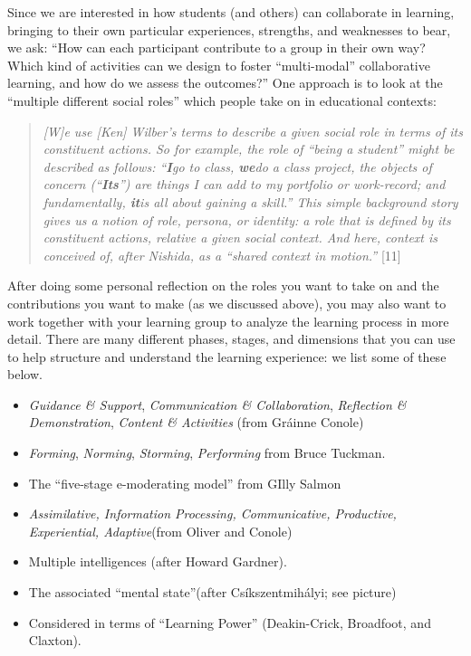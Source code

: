 Since we are interested in how students (and others) can collaborate in
learning, bringing to their own particular experiences, strengths, and
weaknesses to bear, we ask: ``How can each participant contribute to a
group in their own way? Which kind of activities can we design to foster
``multi-modal'' collaborative learning, and how do we assess the
outcomes?'' One approach is to look at the ``multiple different social
roles'' which people take on in educational contexts:

\begin{quote}
\emph{{[}W{]}e use {[}Ken{]} Wilber's terms to describe a given social
role in terms of its constituent actions. So for example, the role of
``being a student'' might be described as follows: ``\textbf{I}}\emph{go
to class, \textbf{we}}\emph{do a class project, the objects of concern
(``\textbf{Its}}\emph{'') are things I can add to my portfolio or
work-record; and fundamentally, \textbf{it}}\emph{is all about gaining a
skill.'' This simple background story gives us a notion of role,
persona, or identity: a role that is defined by its constituent actions,
relative a given social context. And here, context is conceived of,
after Nishida, as a ``shared context in motion.''} {[}11{]}
\end{quote}

After doing some personal reflection on the roles you want to take on
and the contributions you want to make (as we discussed above), you may
also want to work together with your learning group to analyze the
learning process in more detail. There are many different phases,
stages, and dimensions that you can use to help structure and understand
the learning experience: we list some of these below.

\begin{itemize}
\item
  \emph{Guidance \& Support}, \emph{Communication \& Collaboration},
  \emph{Reflection \& Demonstration}, \emph{Content \& Activities} (from
  Gráinne Conole)
\item
  \emph{Forming}, \emph{Norming}, \emph{Storming}, \emph{Performing}
  from Bruce Tuckman.
\item
  The ``five-stage e-moderating model'' from GIlly Salmon
\item
  \emph{Assimilative, Information Processing, Communicative, Productive,
  Experiential, Adaptive}(from Oliver and Conole)
\item
  Multiple intelligences (after Howard Gardner).
\item
  The associated ``mental state''(after Csíkszentmihályi; see
  picture)\emph{}
\item
  Considered in terms of ``Learning Power'' (Deakin-Crick, Broadfoot,
  and Claxton).
\end{itemize}

